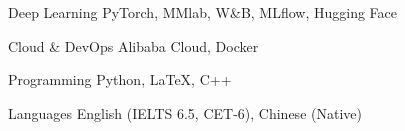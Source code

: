 

\begin{cvskills}

  \cvskill
    {Deep Learning}
    {PyTorch, MMlab, W\&B, MLflow, Hugging Face}

  \cvskill
    {Cloud \& DevOps}
    {Alibaba Cloud, Docker}

  \cvskill
    {Programming}
    {Python, LaTeX, C++}

  \cvskill
    {Languages}
    {English (IELTS 6.5, CET-6), Chinese (Native)}

\end{cvskills}
